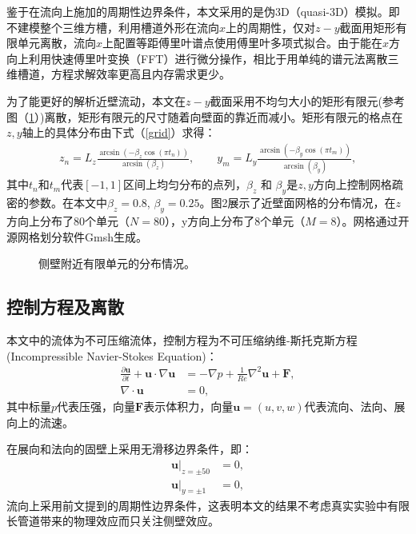 鉴于在流向上施加的周期性边界条件，本文采用的是伪3D（quasi-3D）模拟。即不建模整个三维方槽，利用槽道外形在流向$x$上的周期性，仅对$z-y$截面用矩形有限单元离散，流向$x$上配置等距傅里叶谱点使用傅里叶多项式拟合。由于能在$x$方向上利用快速傅里叶变换（FFT）进行微分操作，相比于用单纯的谱元法离散三维槽道，方程求解效率更高且内存需求更少。

为了能更好的解析近壁流动，本文在$z-y$截面采用不均匀大小的矩形有限元(参考图（\ref{fig:wall_distri}）)离散，矩形有限元的尺寸随着向壁面的靠近而减小。矩形有限元的格点在$z,y$轴上的具体分布由下式（\ref{grid}）求得：
\begin{equation}\label{grid}
\begin{aligned}
z_n=L_z\frac{\arcsin(-\beta_z \cos(\pi t_n))}{\arcsin(\beta_z)}, \quad\quad y_m=L_y\frac{\arcsin(-\beta_y \cos(\pi t_m))}{\arcsin(\beta_y)},
\end{aligned}
\end{equation}
其中$t_n$和$t_m$代表$[-1,1]$区间上均匀分布的点列，$\beta_z$ 和 $\beta_y$是$z,y$方向上控制网格疏密的参数。在本文中$\beta_z = 0.8$, $\beta_y = 0.25$。图2展示了近壁面网格的分布情况，在$z$方向上分布了80个单元（$N = 80$），y方向上分布了8个单元（$M = 8$）。网格通过开源网格划分软件Gmsh生成\cite{2008Gmsh}。

\begin{figure}
	\centering
    \caption{侧壁附近有限单元的分布情况。}
    \label{fig:wall_distri}
\end{figure}

\subsection{控制方程及离散}
本文中的流体为不可压缩流体，控制方程为不可压缩纳维-斯托克斯方程(Incompressible Navier-Stokes Equation)：
\begin{equation}\label{equ:NS}
\begin{aligned}
\frac{\partial \boldsymbol{u}}{\partial t} + \boldsymbol{u}\cdot \nabla\boldsymbol{u} &= -\nabla p + \frac{1}{Re} \nabla^2 \boldsymbol{u} + \boldsymbol{F}, \\
\nabla\cdot \boldsymbol{u} &= 0,
\end{aligned}
\end{equation}
其中标量$p$代表压强，向量$\boldsymbol{F}$表示体积力，向量$\boldsymbol{u} = (u,v,w)$代表流向、法向、展向上的流速。

在展向和法向的固壁上采用无滑移边界条件，即：
\begin{equation}\label{equ:BC}
\begin{array}{ll}
\boldsymbol{u}|_{z=\pm 50} &= 0, \\
\boldsymbol{u}|_{y=\pm 1} &= 0,
\end{array}
\end{equation}
流向上采用前文提到的周期性边界条件，这表明本文的结果不考虑真实实验中有限长管道带来的物理效应而只关注侧壁效应。

